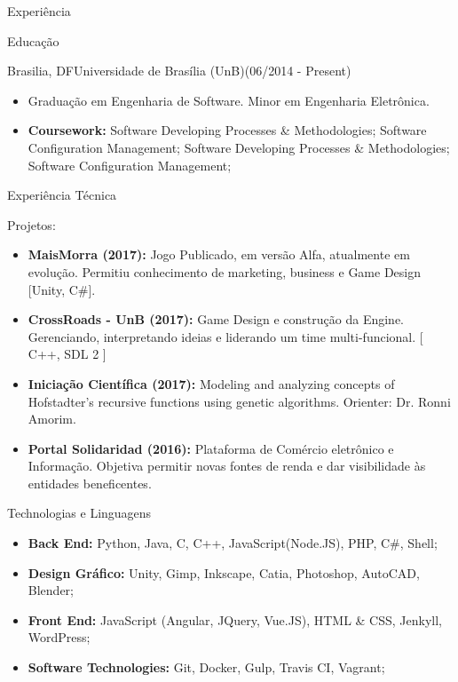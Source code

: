 \documentclass[]{fraguilarcv}
\begin{document}
\begin{cvsection}{Experiência}
	\begin{cvsection}{Educação}
		\begin{cvsubsection}{Brasilia, DF}{Universidade de Brasília (UnB)}{(06/2014 - Present)}
			\begin{itemize}
				\item Graduação em Engenharia de Software. Minor em Engenharia Eletrônica.
				\item \textbf{Coursework:} {Software Developing Processes \& Methodologies; Software Configuration Management; Software Developing Processes \& Methodologies; Software Configuration Management; }
			\end{itemize}
		\end{cvsubsection}
	\end{cvsection}

	\begin{cvsection}{Experiência Técnica}
		\begin{cvsubsection}{Projetos:}{}{}
			\begin{itemize}
	    	\item \textbf{MaisMorra (2017):} Jogo Publicado, em versão Alfa, atualmente em evolução. Permitiu conhecimento de marketing, business e Game Design [Unity, C\#].
			\item \textbf{CrossRoads - UnB (2017):} Game Design e construção da Engine. Gerenciando, interpretando ideias e liderando um time multi-funcional. [ C++, SDL 2 ]
			\item \textbf{Iniciação Científica (2017):} Modeling and analyzing concepts of Hofstadter's recursive functions using genetic algorithms. Orienter: Dr. Ronni Amorim.
	      	\item \textbf{Portal Solidaridad (2016):} Plataforma de Comércio eletrônico e Informação. Objetiva permitir novas fontes de renda e dar visibilidade às entidades beneficentes.
			\end{itemize}
		\end{cvsubsection}
	\end{cvsection}

	\begin{cvsection}{Technologias e Linguagens}
		\begin{cvsubsection}{}{}{}
			\begin{itemize}
			\item \textbf{Back End:} Python, Java, C, C++, JavaScript(Node.JS), PHP, C\#, Shell;
			\item \textbf{Design Gráfico:} Unity, Gimp, Inkscape, Catia, Photoshop, AutoCAD, Blender;
	      	\item \textbf{Front End:} JavaScript (Angular, JQuery, Vue.JS), HTML \& CSS, Jenkyll, WordPress;
	      	\item \textbf{Software Technologies:} Git, Docker, Gulp, Travis CI, Vagrant;
			\end{itemize}
		\end{cvsubsection}
	\end{cvsection}
\end{cvsection}
\end{document}
